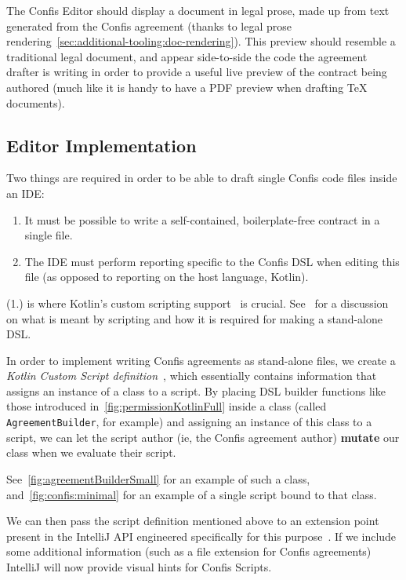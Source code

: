The Confis Editor should display a document in legal prose, made up from text generated from the Confis agreement (thanks to legal prose rendering~\ref{sec:additional-tooling:doc-rendering}).
This preview should resemble a traditional legal document, and appear side-to-side the code the agreement drafter is writing in order to provide a useful live preview of the contract being authored (much like it is handy to have a PDF preview when drafting TeX documents).

\subsection{Editor Implementation}\label{subsec:editor-implementation}

Two things are required in order to be able to draft single Confis code files inside an IDE:
\begin{enumerate}
    \item It must be possible to write a self-contained, boilerplate-free contract in a single file.
    \item The IDE must perform reporting specific to the Confis DSL when editing this file (as opposed to reporting on the host language, Kotlin).
\end{enumerate}

(1.) is where Kotlin's custom scripting support~\cite{kotlinScriptKeep} is crucial.
See~ for a discussion on what is meant by scripting and how it is required for making a stand-alone DSL.

In order to implement writing Confis agreements as stand-alone files, we create a \emph{Kotlin Custom Script definition}~\cite{kotlinScriptKeep}, which essentially contains information that assigns an instance of a class to a script.
By placing DSL builder functions like those introduced in~\autoref{fig:permissionKotlinFull} inside a class (called \texttt{AgreementBuilder}, for example) and assigning an instance of this class to a script, we can let the script author (ie, the Confis agreement author) \textbf{mutate} our class when we evaluate their script.

See~\autoref{fig:agreementBuilderSmall} for an example of such a class, and~\autoref{fig:confis:minimal} for an example of a single script bound to that class.

We can then pass the script definition mentioned above to an extension point present in the IntelliJ API engineered specifically for this purpose~\cite{ideaExtensionPoints, intelliJRepo}.
If we include some additional information (such as a file extension for Confis agreements) IntelliJ will now provide visual hints for Confis Scripts.


